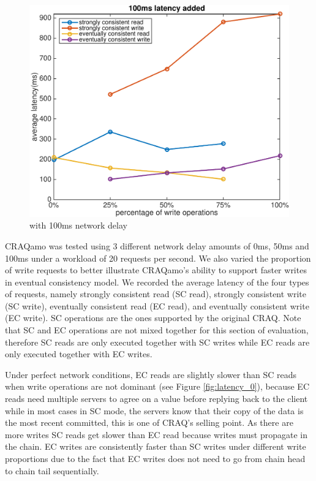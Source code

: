 \begin{figure}[hbt]
\centering
\includegraphics[width=\linewidth]{figures/latency_100.pdf}
\caption{with 100ms network delay}
\label{fig:latency_100}
\end{figure}
\vspace{-2mm}


CRAQamo was tested using 3 different network delay amounts of 0ms, 50ms and 100ms under a workload of 20 requests per second. We also varied the proportion of write requests to better illustrate CRAQamo's ability to support faster writes in eventual consistency model. We recorded the average latency of the four types of requests, namely strongly consistent read (SC read), strongly consistent write (SC write), eventually consistent read (EC read), and eventually consistent write (EC write). SC operations are the ones supported by the original CRAQ. Note that SC and EC operations are not mixed together for this section of evaluation, therefore SC reads are only executed together with SC writes while EC reads are only executed together with EC writes. 

Under perfect network conditions, EC reads are slightly slower than SC reads when write operations are not dominant (see Figure \ref{fig:latency_0}), because EC reads need multiple servers to agree on a value before replying back to the client while in most cases in SC mode, the servers know that their copy of the data is the most recent committed, this is one of CRAQ's selling point. As there are more writes SC reads get slower than EC read because writes must propagate in the chain. EC writes are consistently faster than SC writes under different write proportions due to the fact that EC writes does not need to go from chain head to chain tail sequentially.


